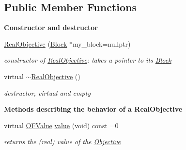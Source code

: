\subsection*{Public Member Functions}
\begin{Indent}\textbf{ Constructor and destructor}\par
\begin{DoxyCompactItemize}
\item 
\mbox{\hyperlink{class_s_m_spp__di__unipi__it_1_1_real_objective_a48781de868c0394b5b83fd7f21f0405b}{Real\+Objective}} (\mbox{\hyperlink{class_s_m_spp__di__unipi__it_1_1_block}{Block}} $\ast$my\+\_\+block=nullptr)
\begin{DoxyCompactList}\small\item\em constructor of \mbox{\hyperlink{class_s_m_spp__di__unipi__it_1_1_real_objective}{Real\+Objective}}\+: takes a pointer to its \mbox{\hyperlink{class_s_m_spp__di__unipi__it_1_1_block}{Block}} \end{DoxyCompactList}\item 
\mbox{\label{class_s_m_spp__di__unipi__it_1_1_real_objective_ade1613d55020ecc8ec1353f2acc73469}} 
virtual \mbox{\hyperlink{class_s_m_spp__di__unipi__it_1_1_real_objective_ade1613d55020ecc8ec1353f2acc73469}{$\sim$\+Real\+Objective}} ()
\begin{DoxyCompactList}\small\item\em destructor, virtual and empty \end{DoxyCompactList}\end{DoxyCompactItemize}
\end{Indent}
\begin{Indent}\textbf{ Methods describing the behavior of a Real\+Objective}\par
\begin{DoxyCompactItemize}
\item 
virtual \mbox{\hyperlink{class_s_m_spp__di__unipi__it_1_1_real_objective_ab8ce6bff9c21fdcd41e355167209301a}{O\+F\+Value}} \mbox{\hyperlink{class_s_m_spp__di__unipi__it_1_1_real_objective_a0f22975a7eb12dac66b8c31ec72ac13e}{value}} (void) const =0
\begin{DoxyCompactList}\small\item\em returns the (real) value of the \mbox{\hyperlink{class_s_m_spp__di__unipi__it_1_1_objective}{Objective}} \end{DoxyCompactList}\end{DoxyCompactItemize}
\end{Indent}
